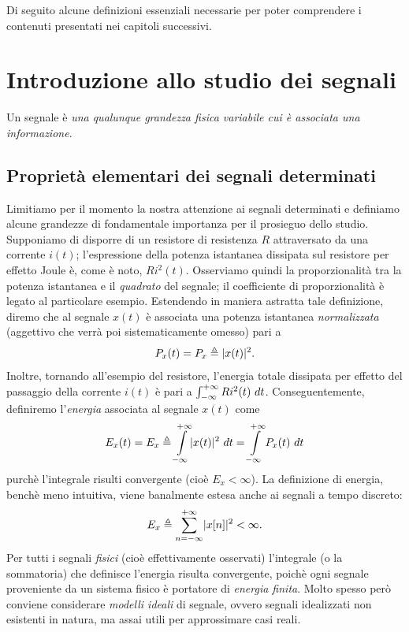 \documentclass[12pt,oneside,openany]{memoir}
\numberwithin{equation}{subsection}
\DeclarePairedDelimiter{\abs}{\lvert}{\rvert}
\newcommand{\dt}{\ dt}
\begin{document}
Di seguito alcune definizioni essenziali necessarie per poter comprendere i contenuti presentati nei capitoli successivi.

\section{Introduzione allo studio dei segnali}
Un segnale \`e \textit{una qualunque grandezza fisica variabile cui \`e associata una informazione}.

\subsection{Propriet\`a elementari dei segnali determinati}
Limitiamo per il momento la nostra attenzione ai segnali determinati e definiamo alcune grandezze di fondamentale importanza per il prosieguo dello studio.
Supponiamo di disporre di un resistore di resistenza $R$ attraversato da una corrente $i(t)$; l'espressione della potenza istantanea dissipata sul resistore per effetto Joule \`e, come \`e noto, $Ri^2(t)$. Osserviamo quindi la proporzionalit\`a tra la potenza istantanea e il \textit{quadrato} del segnale; il coefficiente di proporzionalit\`a \`e legato al particolare esempio. Estendendo in maniera astratta tale definizione, diremo che al segnale $x(t)$ \`e associata una potenza istantanea \textit{normalizzata} (aggettivo che verr\`a poi sistematicamente omesso) pari a
\begin{equation}
	P_x(t) = P_x \triangleq \abs{x(t)}^2.
\end{equation}
Inoltre, tornando all'esempio del resistore, l'energia totale dissipata per effetto del passaggio della corrente $i(t)$ \`e pari a $\int\displaylimits_{-\infty}^{+\infty} Ri^2(t) \dt$. Conseguentemente, definiremo l'\textit{energia} associata al segnale $x(t)$ come
\begin{equation}
	E_x(t) = E_x \triangleq \int\displaylimits_{-\infty}^{+\infty} \abs{x(t)}^2 \dt = \int\displaylimits_{-\infty}^{+\infty} P_x(t) \dt
\end{equation}
purch\`e l'integrale risulti convergente (cio\`e $E_x < \infty$). La definizione di energia, bench\`e meno intuitiva, viene banalmente estesa anche ai segnali a tempo discreto:
\begin{equation}
	E_x \triangleq \sum_{n = -\infty}^{+\infty} \abs{x[n]}^2 < \infty.
\end{equation}
Per tutti i segnali \textit{fisici} (cio\`e effettivamente osservati) l'integrale (o la sommatoria) che definisce l'energia risulta convergente, poich\`e ogni segnale proveniente da un sistema fisico \`e portatore di \textit{energia finita}. Molto spesso per\`o conviene considerare \textit{modelli ideali} di segnale, ovvero segnali idealizzati non esistenti in natura, ma assai utili per approssimare casi reali.\\
\end{document}
